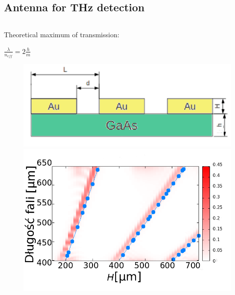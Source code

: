 \documentclass{beamer}
\begin{document}
\subsection{Antenna for THz detection}
\begin{frame}
	\begin{columns}
		\begin{column}{0.5\textwidth}
			{\tiny Theoretical maximum of transmission:}\\
			\centerline{$\frac{\lambda}{n_{eff}}=2\frac{h}{m}$}
			\begin{figure}[htb]
				\includegraphics[width=.9\textwidth]{./schemat.png}\\
				\includegraphics[width=.9\textwidth]{../images/antenaThz/rezonant_trans_f001.png}\\
			\end{figure}
		

\end{column}
\end{columns}
\end{frame}
\end{document}
